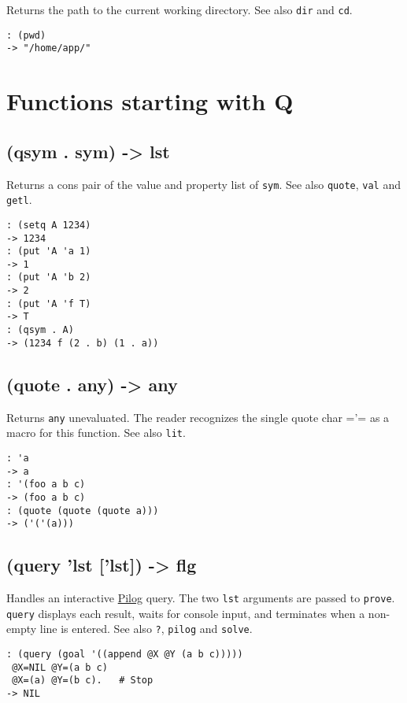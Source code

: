 {{{{{{{{Returns the path to the current working directory. See also \texttt{dir} and
\texttt{cd}.


\begin{verbatim}
: (pwd)
-> "/home/app/"
\end{verbatim}


\chapter{Functions starting with Q}
\label{sec-8-1-17}


 
\section{(qsym . sym) -> lst}
\label{sec-8-1-17-1}


Returns a cons pair of the value and property list of \texttt{sym}. See also
\texttt{quote}, \texttt{val} and \texttt{getl}.


\begin{verbatim}
: (setq A 1234)
-> 1234
: (put 'A 'a 1)
-> 1
: (put 'A 'b 2)
-> 2
: (put 'A 'f T)
-> T
: (qsym . A)
-> (1234 f (2 . b) (1 . a))
\end{verbatim}

 
\section{(quote . any) -> any}
\label{sec-8-1-17-2}


Returns \texttt{any} unevaluated. The reader recognizes the single quote char
='= as a macro for this function. See also \texttt{lit}.


\begin{verbatim}
: 'a
-> a
: '(foo a b c)
-> (foo a b c)
: (quote (quote (quote a)))
-> ('('(a)))
\end{verbatim}

 
\section{(query 'lst ['lst]) -> flg}
\label{sec-8-1-17-3}


Handles an interactive \hyperref[ref.html-pilog]{Pilog} query. The two \texttt{lst}
arguments are passed to \texttt{prove}. \texttt{query} displays each result, waits for
console input, and terminates when a non-empty line is entered. See also
\texttt{?}, \texttt{pilog} and \texttt{solve}.


\begin{verbatim}
: (query (goal '((append @X @Y (a b c)))))
 @X=NIL @Y=(a b c)
 @X=(a) @Y=(b c).   # Stop
-> NIL
\end{verbatim}

}}}}}}}}
